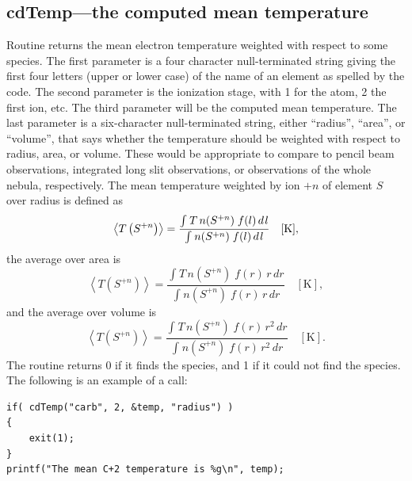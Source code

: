 \subsection{cdTemp---the computed mean temperature}
\label{sec:SubroutineCdTemp}

Routine  returns the mean electron temperature weighted with respect
to some species.
The first parameter is a four character null-terminated
string giving the first four letters (upper or lower case) of the name of
an element as spelled by the code.
The second parameter is the ionization
stage, with 1 for the atom, 2 the first ion, etc.
The third parameter will
be the computed mean temperature.
The last parameter is a six-character
null-terminated string, either ``radius'', ``area'', or ``volume'', that says whether
the temperature should be weighted with respect to radius, area, or volume.
These would be appropriate to compare to pencil beam observations,
integrated long slit observations, or observations of the whole nebula, respectively.
The mean temperature weighted by ion $+n$ of element $S$ over radius
is defined as
\begin{equation}
\left\langle {T\left( {{S^{ + n}}} \right)} \right\rangle  =
\frac{{\int_{}^{} {T\,n({S^{ + n}})\;f(l)\,d{\kern 1pt} l} }}{{\int_{}^{}
{n({S^{ + n}})\;f(l)\,d{\kern 1pt} l} }}\quad [\mathrm{K}],
\end{equation}
the average over area is
\begin{equation}
\left\langle {T\left( {{S^{ + n}}} \right)} \right\rangle  =
\frac{{\int_{}^{} {T\,n({S^{ + n}})\;f(r)\,r\,dr} }}{{\int_{}^{} {n({S^{ +
n}})\;f(r)\,r\,dr} }}
\quad [\mathrm{K}],
\end{equation}
and the average over volume  is
\begin{equation}
\left\langle {T\left( {{S^{ + n}}} \right)} \right\rangle  =
\frac{{\int_{}^{} {T\,n({S^{ + n}})\;f(r)\,r^2\,dr} }}{{\int_{}^{} {n({S^{ +
n}})\;f(r)\,r^2\,dr} }}
\quad [\mathrm{K}] .
\end{equation}
The routine returns 0 if it finds the species, and 1 if it could not find
the species.  The following is an example of a call:
\begin{verbatim}
if( cdTemp("carb", 2, &temp, "radius") )
{
    exit(1);
}
printf("The mean C+2 temperature is %g\n", temp);
\end{verbatim}

